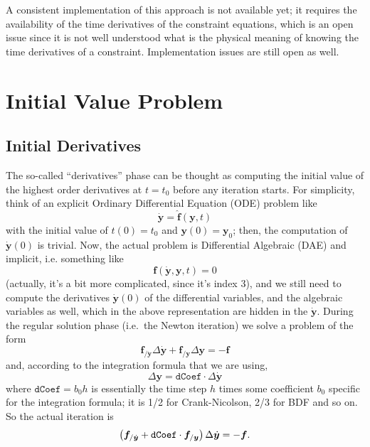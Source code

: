 \documentclass[10pt,fleqn,subeqn]{report}
\newcommand{\T}[1]{\bm{#1}}
\begin{document}
A consistent implementation of this approach is not available yet;
it requires the availability of the time derivatives 
of the constraint equations, which is an open issue since it is not
well understood what is the physical meaning of knowing 
the time derivatives of a constraint.
Implementation issues are still open as well.


\section{Initial Value Problem}
\subsection{Initial Derivatives}
The so-called ``derivatives'' phase can be thought as computing
the initial value of the highest order derivatives at $t=t_0$
before any iteration starts.
For simplicity, think of an explicit Ordinary Differential Equation
(ODE) problem like
\begin{equation}
	\dot{\T{y}} = \hat{\T{f}}(\T{y}, t)
\end{equation}
with the initial value of $t(0) = t_0$ and $\T{y}(0) = \T{y}_0$; 
then, the computation of $\dot{\T{y}}(0)$ is trivial.  
Now, the actual problem is Differential Algebraic (DAE) and implicit, 
i.e. something like
\begin{equation}
  \T{f}(\dot{\T{y}}, \T{y}, t) = 0
\end{equation}
(actually, it's a bit more complicated, since it's index 3), 
and we still need to compute the derivatives $\dot{\T{y}}(0)$ 
of the differential variables, and the algebraic variables as well, 
which in the above representation are hidden in the $\dot{\T{y}}$.
During the regular solution phase (i.e.\ the Newton iteration) 
we solve a problem of the form
\begin{equation}
  \T{f}_{/\dot{\T{y}}} \Delta \dot{\T{y}} + \T{f}_{/\T{y}} \Delta \T{y} = - \T{f}
\end{equation}
and, according to the integration formula that we are using,
\begin{equation}
  \Delta \T{y} = \texttt{dCoef} \cdot \Delta \dot{\T{y}}
\end{equation}
where $\texttt{dCoef} = b_0 h$ is essentially the time step $h$
times some coefficient $b_0$ specific for the integration formula;
it is 1/2 for Crank-Nicolson, 2/3 for BDF and so on.
So the actual iteration is
\begin{equation}
	\plbr{\T{f}_{/\dot{\T{y}}} + \texttt{dCoef} \cdot \T{f}_{/\T{y}} } \Delta \dot{\T{y}} = - \T{f}
	\label{eq:derivatives:iteration}
	.
\end{equation}
\end{document}
